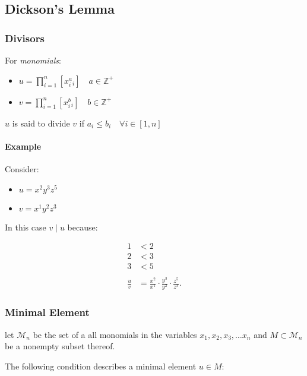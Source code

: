 \documentclass[a4paper,11pt,twoside]{article}
\begin{document}
\subsection{Dickson's Lemma}
\label{sec:org9ea2e4a}
\subsubsection{Divisors}
\label{sec:org182f422}
For \emph{monomials}:

\begin{itemize}
\item \(u= \prod^n_{i=1}\left[ x_i^a_i \right] \quad a \in \mathbb{Z^+}\)
\item \(v= \prod^n_{i=1}\left[ x_i^b_i \right] \quad b \in \mathbb{Z^+}\)
\end{itemize}

\(u\) is said to divide \(v\) if \(a_i \leq b_i \quad \forall i \in \left[ 1, n \right]\)

\paragraph{Example}
\label{sec:org0855b04}

Consider:

\begin{itemize}
\item \(u = x^2y^3z^5\)
\item \(v = x^1y^2z^3\)
\end{itemize}

In this case \(v \mid u\) because:

\begin{align*}
      1 &< 2 \\
      2 &< 3 \\
      3 &< 5 \\
      \ \\
      \frac{u}{v} &= \frac{x^2}{x^1} \cdot \frac{y^3}{y^2} \cdot  \frac{z^5}{z^3}
.\end{align*}

\subsubsection{Minimal Element}
\label{sec:orgbff35fe}

let \(\mathcal{M}_n\) be the set of a all monomials in the variables
\(x_1, x_2, x_3, \ldots x_n\) and \(M \subset \mathcal{M}_n\) be a
nonempty subset thereof.

The following condition describes a minimal element \(u\in M\):
\end{document}

